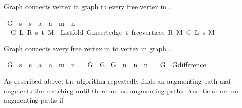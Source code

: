 \begin{isabellebody}
\begin{isamarkuptext}%
Graph  connects vertex  in graph  to every free vertex in
.%
\end{isamarkuptext}\isamarkuptrue%
\isamarkupfalse%
\ G{}{\isacharunderscore}{\kern0pt}{}\ {\isacharcolon}{\kern0pt}{\isacharcolon}{\kern0pt}\ {\isachardoublequoteopen}{\isacharprime}{\kern0pt}s\ {\isasymRightarrow}\ {\isacharprime}{\kern0pt}s\ {\isasymRightarrow}\ {\isacharprime}{\kern0pt}a\ {\isasymRightarrow}\ {\isacharprime}{\kern0pt}a\ {\isasymRightarrow}\ {\isacharprime}{\kern0pt}m\ {\isasymRightarrow}\ {\isacharprime}{\kern0pt}n{\isachardoublequoteclose}\ \isanewline
\ \ {\isachardoublequoteopen}G{}{\isacharunderscore}{\kern0pt}{}\ L\ R\ s\ t\ M\ {\isasymequiv}\ List{\isachardot}{\kern0pt}fold\ {\isacharparenleft}{\kern0pt}G{\isachardot}{\kern0pt}insert{\isacharunderscore}{\kern0pt}edge\ t{\isacharparenright}{\kern0pt}\ {\isacharparenleft}{\kern0pt}free{\isacharunderscore}{\kern0pt}vertices\ R\ M{\isacharparenright}{\kern0pt}\ {\isacharparenleft}{\kern0pt}G{}{\isacharunderscore}{\kern0pt}{}\ L\ s\ M{\isacharparenright}{\kern0pt}{\isachardoublequoteclose}%
\begin{isamarkuptext}%
Graph  connects every free vertex in  to vertex  in graph
.%
\end{isamarkuptext}\isamarkuptrue%
\isamarkupfalse%
\ G{}\ {\isacharcolon}{\kern0pt}{\isacharcolon}{\kern0pt}\ {\isachardoublequoteopen}{\isacharprime}{\kern0pt}s\ {\isasymRightarrow}\ {\isacharprime}{\kern0pt}s\ {\isasymRightarrow}\ {\isacharprime}{\kern0pt}a\ {\isasymRightarrow}\ {\isacharprime}{\kern0pt}a\ {\isasymRightarrow}\ {\isacharprime}{\kern0pt}m\ {\isasymRightarrow}\ {\isacharprime}{\kern0pt}n{\isachardoublequoteclose}\ \isanewline
\ \ {\isachardoublequoteopen}G{}\ {\isasymequiv}\ G{}{\isacharunderscore}{\kern0pt}{}{\isachardoublequoteclose}\isanewline
\isanewline
{}\isamarkupfalse%
\ G{}\ {\isacharcolon}{\kern0pt}{\isacharcolon}{\kern0pt}\ {\isachardoublequoteopen}{\isacharprime}{\kern0pt}n\ {\isasymRightarrow}\ {\isacharprime}{\kern0pt}n\ {\isasymRightarrow}\ {\isacharprime}{\kern0pt}n{\isachardoublequoteclose}\ \isanewline
\ \ {\isachardoublequoteopen}G{}\ {\isasymequiv}\ G{\isachardot}{\kern0pt}difference{\isachardoublequoteclose}%
\begin{isamarkuptext}%
As described above, the algorithm repeatedly finds an augmenting path and augments the matching
until there are no augmenting paths. And there are no augmenting paths if


\end{isamarkuptext}
\end{isabellebody}
